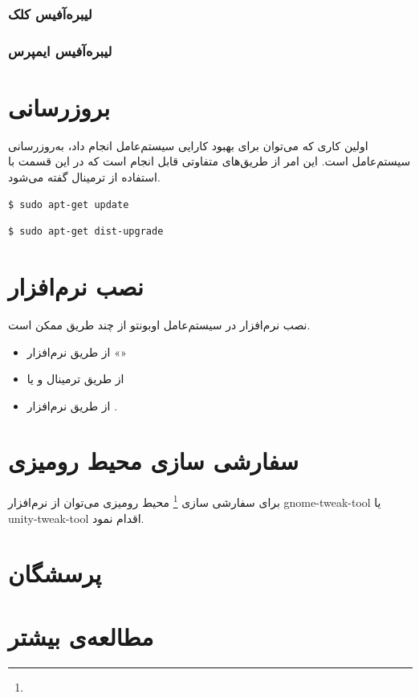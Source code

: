 \subsubsection{لیبره‌آفیس کلک}
\subsubsection{لیبره‌آفیس ایمپرس}
\section{بروزرسانی}
اولین کاری که می‌توان برای بهبود کارایی سیستم‌عامل انجام داد، به‌روزرسانی سیستم‌عامل است. این امر از طریق‌های متفاوتی قابل انجام است که در این قسمت با استفاده از ترمینال گفته می‌شود.

\begin{latin}
\begin{lstlisting}
$ sudo apt-get update
\end{lstlisting}
\end{latin}

\begin{latin}
\begin{lstlisting}
$ sudo apt-get dist-upgrade
\end{lstlisting}
\end{latin}
\section{نصب نرم‌افزار}
نصب نرم‌افزار در سیستم‌عامل اوبونتو از چند طریق ممکن است. 

\begin{itemize}
\item از طریق نرم‌افزار 
«»
\item از طریق ترمینال و یا
\item از طریق نرم‌افزار .
\end{itemize}

\section{سفارشی سازی محیط رومیزی}
برای سفارشی سازی
\footnote{}
محیط رومیزی می‌توان از نرم‌افزار gnome-tweak-tool یا unity-tweak-tool اقدام نمود.

\section{پرسشگان}
\section{مطالعه‌ی بیشتر}
